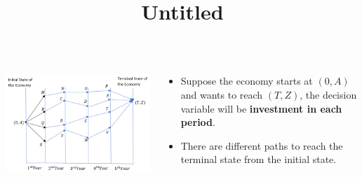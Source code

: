 \documentclass[
  ignorenonframetext,
]{beamer}
\title{Untitled}
\author{}
\date{}
\providecommand{\tightlist}{%
  \setlength{\itemsep}{0pt}\setlength{\parskip}{0pt}}\usepackage{longtable,booktabs,array}
\begin{document}
\frame{\titlepage}


\begin{frame}
\begin{columns}[T]
\begin{column}{0.5\textwidth}
\includegraphics[width=4\textwidth,height=\textheight]{images/do_paths.png}
\end{column}

\begin{column}{0.5\textwidth}
\begin{itemize}
\tightlist
\item
  Suppose the economy starts at \((0,A)\) and wants to reach \((T,Z)\),
  the decision variable will be \textbf{investment in each period}.
\item
  There are different paths to reach the terminal state from the initial
  state.
\end{itemize}
\end{column}
\end{columns}
\end{frame}
\end{document}
